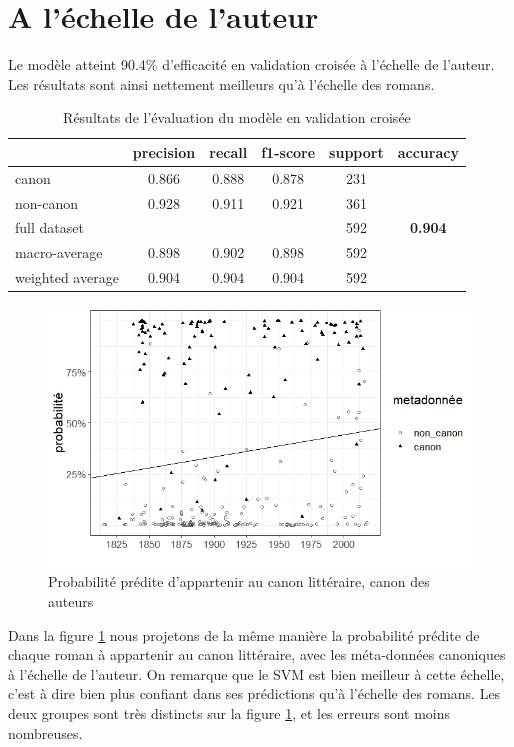 \section{A l'échelle de l'auteur}

Le modèle atteint 90.4\% d'efficacité en validation croisée à l'échelle de l'auteur. Les résultats sont ainsi nettement meilleurs qu'à l'échelle des romans. 
	\begin{table}[ht]
		\centering %
		\begin{tabular}{l c c c c c}
			\toprule
    			 & precision & recall & f1-score & support & accuracy \\
			\toprule
			canon & 0.866 & 0.888 & 0.878 & 231 \\
			\midrule
			non-canon & 0.928 & 0.911 & 0.921 & 361 \\
			\midrule
			full dataset & & & & 592 & \textbf{0.904}\\
			\midrule
			macro-average & 0.898 & 0.902 & 0.898 & 592 \\
			\midrule
			weighted average & 0.904 & 0.904 & 0.904 & 592 \\

			\bottomrule
		\end{tabular}
	\caption{Résultats de l'évaluation du modèle en validation croisée}
	\end{table} 

\bigskip
\begin{figure}[!ht]
    \centering
    \includegraphics[width=15cm]{img/09_fabula_visual_svm.png}
    \caption{Probabilité prédite d'appartenir au canon littéraire, canon des auteurs}
    \label{svm_author}
\end{figure}


Dans la figure \ref{svm_author} nous projetons de la même manière la probabilité prédite de chaque roman à appartenir au canon littéraire, avec les méta-données canoniques à l'échelle de l'auteur. On remarque que le SVM est bien meilleur à cette échelle, c'est à dire bien plus confiant dans ses prédictions qu'à l'échelle des romans. Les deux groupes sont très distincts sur la figure \ref{svm_author}, et les erreurs sont moins nombreuses.   


